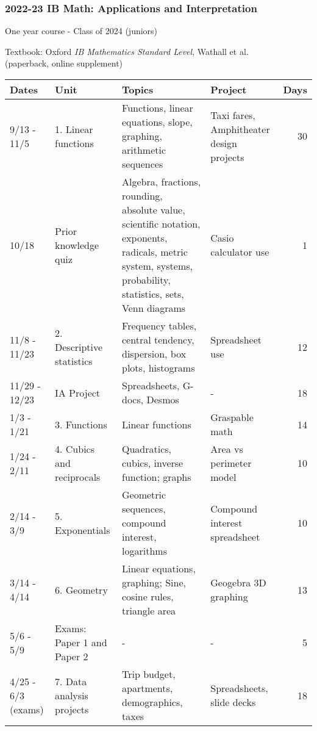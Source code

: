 

\geometry{landscape} %

\fancyhead[RE]{\thepage}



\subsubsection*{2022-23 IB Math: Applications and Interpretation} 
One year course - Class of 2024 (juniors) \par
Textbook: Oxford \emph{IB Mathematics Standard Level}, Wathall et al. \\
(paperback, online supplement) \par \medskip
\begin{tabular}{|p{2.4cm}|p{5.5cm}|p{8cm}|p{4cm}|r|}
  \hline
  Dates & Unit & Topics  & Project & Days \\
  \hline
  9/13 - 11/5 & 1. Linear functions & Functions, linear equations, slope, graphing, arithmetic sequences & Taxi fares, Amphitheater design projects & 30 \\
  \hline
  10/18 & Prior knowledge quiz & Algebra, fractions, rounding, absolute value, scientific notation, exponents, radicals, metric system, systems, probability, statistics, sets, Venn diagrams & Casio calculator use & 1 \\
  \hline
  11/8 - 11/23 & 2. Descriptive statistics & Frequency tables, central tendency, dispersion, box plots, histograms & Spreadsheet use & 12 \\
  \hline
  11/29 - 12/23 & IA Project & Spreadsheets, G-docs, Desmos & - & 18 \\
  \hline
  1/3 - 1/21 & 3. Functions & Linear functions & Graspable math & 14 \\
  \hline
  1/24 - 2/11 & 4. Cubics and reciprocals & Quadratics, cubics, inverse function; graphs & Area vs perimeter model & 10 \\
  \hline
  2/14 - 3/9 & 5. Exponentials & Geometric sequences, compound interest, logarithms & Compound interest spreadsheet & 10 \\
  \hline
  3/14 - 4/14 & 6. Geometry & Linear equations, graphing; Sine, cosine rules, triangle area & Geogebra 3D graphing & 13 \\
  \hline
  5/6 - 5/9 & Exams: Paper 1 and Paper 2 & - & - & 5 \\
  \hline
  4/25 - 6/3 (exams) & 7. Data analysis projects & Trip budget, apartments, demographics, taxes & Spreadsheets, slide decks & 18 \\
  \hline
\end{tabular}

